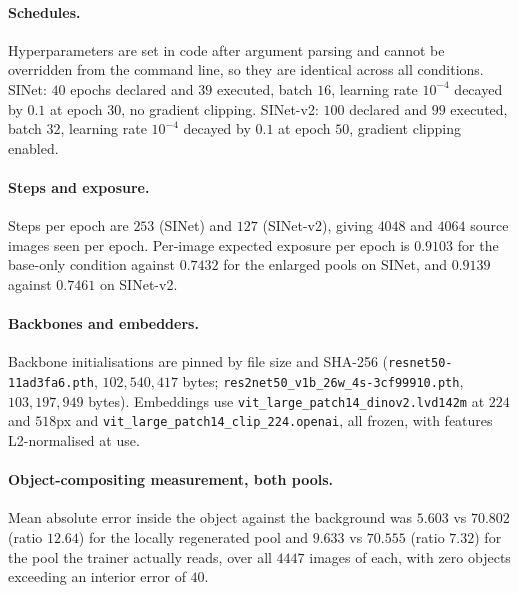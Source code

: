 \documentclass{article}
\begin{document}
\paragraph{Schedules.}
Hyperparameters are set in code after argument parsing and cannot be overridden
from the command line, so they are identical across all conditions. SINet: $40$
epochs declared and $39$ executed, batch $16$, learning rate $10^{-4}$ decayed
by $0.1$ at epoch $30$, no gradient clipping. SINet-v2: $100$ declared and $99$
executed, batch $32$, learning rate $10^{-4}$ decayed by $0.1$ at epoch $50$,
gradient clipping enabled.

\paragraph{Steps and exposure.}
Steps per epoch are $253$ (SINet) and $127$ (SINet-v2), giving $4048$ and $4064$
source images seen per epoch. Per-image expected exposure per epoch is $0.9103$
for the base-only condition against $0.7432$ for the enlarged pools on SINet, and
$0.9139$ against $0.7461$ on SINet-v2.

\paragraph{Backbones and embedders.}
Backbone initialisations are pinned by file size and SHA-256
(\texttt{resnet50-11ad3fa6.pth}, $102{,}540{,}417$ bytes;
\texttt{res2net50\_v1b\_26w\_4s-3cf99910.pth}, $103{,}197{,}949$ bytes).
Embeddings use \texttt{vit\_large\_patch14\_dinov2.lvd142m} at $224$ and $518$px
and \texttt{vit\_large\_patch14\_clip\_224.openai}, all frozen, with features
L2-normalised at use.

\paragraph{Object-compositing measurement, both pools.}
Mean absolute error inside the object against the background was $5.603$ vs
$70.802$ (ratio $12.64$) for the locally regenerated pool and $9.633$ vs
$70.555$ (ratio $7.32$) for the pool the trainer actually reads, over all $4447$
images of each, with zero objects exceeding an interior error of $40$.
\end{document}
